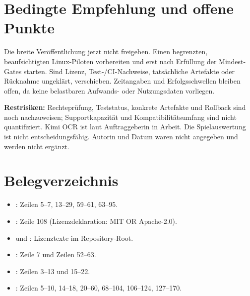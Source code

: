 \documentclass[11pt,a4paper]{scrartcl}
\begin{document}
\section{Bedingte Empfehlung und offene Punkte}\label{sec:schluss}
Die breite Veröffentlichung jetzt nicht freigeben. Einen begrenzten, beaufsichtigten Linux-Piloten vorbereiten und erst nach Erfüllung der Mindest-Gates starten. Sind Lizenz, Test-/CI-Nachweise, tatsächliche Artefakte oder Rücknahme ungeklärt, verschieben. Zeitangaben und Erfolgsschwellen bleiben offen, da keine belastbaren Aufwands- oder Nutzungsdaten vorliegen.

\textbf{Restrisiken:} Rechteprüfung, Teststatus, konkrete Artefakte und Rollback sind noch nachzuweisen; Supportkapazität und Kompatibilitätsumfang sind nicht quantifiziert. Kimi OCR ist laut Auftraggeberin in Arbeit. Die Spielauswertung ist nicht entscheidungsfähig. Autorin und Datum waren nicht angegeben und werden nicht ergänzt.

\appendix
\section{Belegverzeichnis}\label{sec:quellen}
\begin{itemize}
\item {}: Zeilen 5--7, 13--29, 59--61, 63--95.
\item {}: Zeile 108 (Lizenzdeklaration: MIT OR Apache-2.0).
\item {} und : Lizenztexte im Repository-Root.
\item {}: Zeile 7 und Zeilen 52--63.
\item {}: Zeilen 3--13 und 15--22.
\item {}: Zeilen 5--10, 14--18, 20--60, 68--104, 106--124, 127--170.
\end{itemize}
\end{document}
